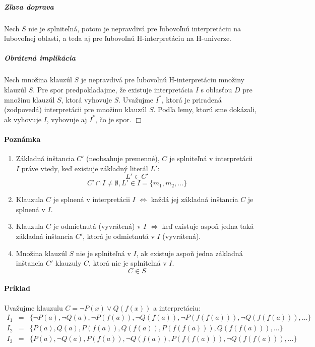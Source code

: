 \subparagraph{Zľava doprava} Nech $S$ nie je splniteľná, potom je nepravdivá pre ľubovoľnú interpretáciu
na ľubovoľnej oblasti, a teda aj pre ľubovoľnú H-interpretáciu na H-univerze.

\subparagraph{Obrátená implikácia} Nech množina klauzúl $S$ je nepravdivá pre
ľubovoľnú H-interpretáciu množiny klauzúl $S$. Pre spor predpokladajme, že
existuje interpretácia $I$ s oblasťou $D$ pre množinu klauzúl $S$, ktorá
vyhovuje $S$. Uvažujme $I^*$, ktorá je priradená (zodpovedá) interpretácii pre
množinu klauzúl $S$. Podľa lemy, ktorú sme dokázali, ak vyhovuje $I$, vyhovuje
aj $I^*$, čo je spor. $\Box$

\paragraph{Poznámka}
\begin{enumerate}
	\item Základná inštancia $C'$ (neobsahuje premenné), $C$ je splniteľná v interpretácii $I$
	práve vtedy, keď existuje základný literál $L'$:
	$$ L' \in C'$$
	$$ C' \cap I \neq \emptyset, L' \in I = \{m_1, m_2, \ldots \} $$

	\item Klauzula $C$ je splnená v interpretácii $I$ $\iff$ každá jej
	základná inštancia $C$ je splnená v $I$.

	\item Klauzula $C$ je odmietnutá (vyvrátená) v $I$ $\iff$ keď existuje
	aspoň jedna taká základná inštancia $C'$, ktorá je odmietnutá v $I$
	(vyvrátená).

	\item Množina klauzúl $S$ nie je splniteľná v $I$, ak existuje aspoň
	jedna základná inštancia $C'$ klauzuly $C$, ktorá nie je splniteľná v
	$I$. $$C \in S$$
\end{enumerate}


\paragraph{Príklad} Uvažujme klauzulu $C=\neg P(x) \lor Q(f(x))$ a
interpretáciu:
$$
\begin{array}{lll}
I_1 &=& \{ \neg P(a), \neg Q(a), \neg P(f(a)), \neg Q(f(a)), \neg P(f(f(a))),
\neg Q(f(f(a))), \ldots \} \\
I_2 &=& \{ P(a), Q(a), P(f(a)), Q(f(a)), P(f(f(a))), Q(f(f(a))), \ldots \} \\
I_3 &=& \{ P(a), \neg Q(a), P(f(a)), \neg Q(f(a)), P(f(f(a))), \neg Q(f(f(a))),
\ldots \} \\
\end{array}
$$

